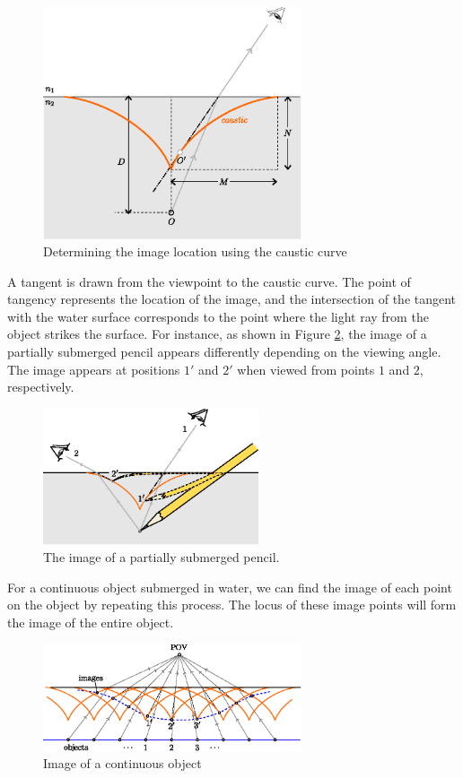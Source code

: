 \documentclass[twocolumn]{article}
\begin{document}
\begin{figure}[h]
	\centering
	\includegraphics[width=3in]{figs/g394.eps}
	\caption{Determining the image location using the caustic curve}
	\label{fig:image_caustic}
\end{figure}

A tangent is drawn from the viewpoint to the caustic curve. The point of tangency represents the location of the image, and the intersection of the tangent with the water surface corresponds to the point where the light ray from the object strikes the surface.
For instance, as shown in Figure \ref{fig:pencil_view}, the image of a partially submerged pencil appears differently depending on the viewing angle. The image appears at positions $1'$ and $2'$ when viewed from points $1$ and $2$, respectively.
\begin{figure}[ht]
	\centering
	\includegraphics[width=2.5in]{figs/g43.eps}
	\caption{The image of a partially submerged pencil.}
	\label{fig:pencil_view}
\end{figure}

For a continuous object submerged in water, we can find the image of each point on the object by repeating this process. The locus of these image points will form the image of the entire object.

\begin{figure}[h]
	\centering
	\includegraphics*[width=3in]{figs/g240.eps}
	\caption{Image of a continuous object}
	\label{fig:extended_image}
\end{figure}
\end{document}

